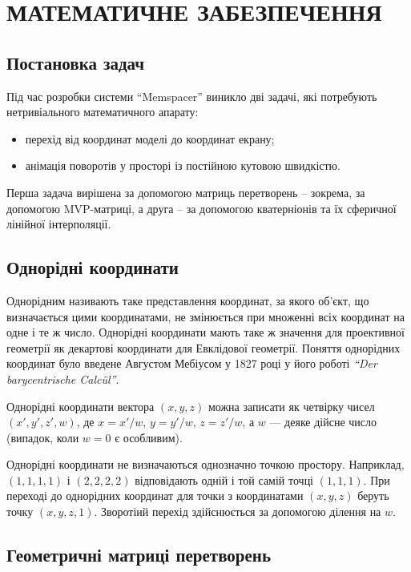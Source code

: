 \section{МАТЕМАТИЧНЕ ЗАБЕЗПЕЧЕННЯ}

\subsection{Постановка задач}

Під час розробки системи ``Memspacer'' виникло дві задачі, які потребують нетривіального математичного апарату:
\begin{itemize}
  \item перехід від координат моделі до координат екрану;
  \item анімація поворотів у просторі із постійною кутовою швидкістю.
\end{itemize}

Перша задача вирішена за допомогою матриць перетворень -- зокрема, за допомогою MVP-матриці, а друга -- за допомогою кватерніонів та їх сферичної лінійної інтерполяції.

\subsection{Однорідні координати}

Однорідним називають таке представлення координат, за якого об'єкт, що визначається цими координатами, не змінюється при множенні всіх координат на одне і те ж число. Однорідні координати мають таке ж значення для проективної геометрії як декартові координати для Евклідової геометрії. Поняття однорідних координат було введене Августом Мебіусом у 1827 році у його роботі \emph{``Der barycentrische Calc\"ul''}\cite{mobius}.

Однорідні координати вектора $(x,y,z)$ можна записати як четвірку чисел $(x',y',z',w)$, де $x=x'/w$, $y=y'/w$, $z=z'/w$, а $w$ — деяке дійсне число (випадок, коли $w = 0$ є особливим).

Однорідні координати не визначаються однозначно точкою простору. Наприклад, $(1,1,1,1)$ і $(2,2,2,2)$ відповідають одній і той самій точці $(1,1,1)$. При переході до однорідних координат для точки з координатами $(x,y,z)$ беруть точку $(x,y,z,1)$. Зворотіий перехід здійснюється за допомогою ділення на $w$.

\subsection{Геометричні матриці перетворень}

